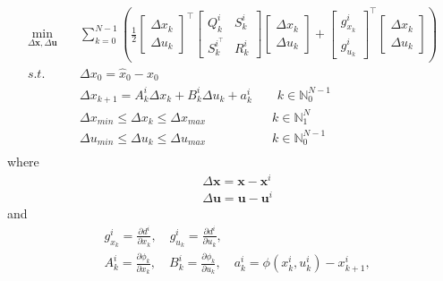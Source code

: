 \begin{equation}\label{QP}
\begin{aligned}
\min_{\Delta \mathbf{x},\Delta \mathbf{u}} \quad & \sum_{k=0}^{N-1}( \frac{1}{2}
\begin{bmatrix}
\Delta x_k\\
\Delta u_k
\end{bmatrix}^\intercal \begin{bmatrix}
Q_k^i & S_k^i \\
S_k^{i^\top} & R_k^i
\end{bmatrix}
\begin{bmatrix}
\Delta x_k\\
\Delta u_k
\end{bmatrix} + \begin{bmatrix}
g_{x_k}^i\\
g_{u_k}^i
\end{bmatrix}^\intercal
\begin{bmatrix}
\Delta x_k\\
\Delta u_k
\end{bmatrix} ) \\
s.t. \quad & \Delta x_0=\hat{x}_0-x_0\\
& \Delta x_{k+1}=A_{k}^i \Delta x_{k}+ B_{k}^i \Delta u_{k} +a_{k}^i \qquad k \in \mathbb{N}_0^{N-1}\\
& \Delta x_{min}\leq \Delta x_k\leq \Delta x_{max}\qquad\qquad\quad\; k \in \mathbb{N}_1^{N}\\
& \Delta u_{min}\leq \Delta u_k\leq\Delta u_{max}\qquad\qquad\quad\; k \in \mathbb{N}_0^{N-1}\\
\end{aligned}
\end{equation}
where 
\begin{equation}
\begin{aligned}
&\Delta \mathbf{x}=\mathbf{x}-\mathbf{x}^i\\
&\Delta \mathbf{u}=\mathbf{u}-\mathbf{u}^i
\end{aligned}
\end{equation}
and
\begin{equation}\label{QP data}
\begin{aligned}
&g_{x_k}^i = \frac{\partial d^i}{\partial x_k},\quad g_{u_k}^i = \frac{\partial d^i}{\partial u_k},\\
&A_k^i=\frac{\partial \phi_k}{\partial x_k}, \quad B_k^i=\frac{\partial \phi_k}{\partial u_k},\quad a_k^i = \phi(x_k^i,u_k^i)-x_{k+1}^i,\\
\end{aligned}
\end{equation}
